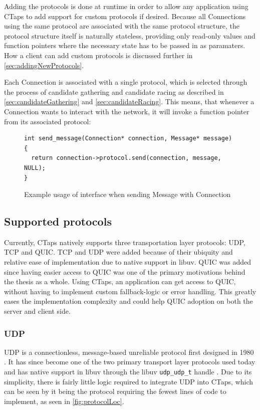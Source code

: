 Adding the protocols is done at runtime in order to allow any
application using CTaps to add support for custom protocols if
desired. Because all Connections using the same protocol are associated
with the same protocol structure, the protocol structure itself
is naturally stateless, providing only read-only values and function
pointers where the necessary state has to be passed in as paramaters.
How a client can add custom protocols is discussed further in \cref{sec:addingNewProtocols}.


Each Connection is associated with a single protocol, which
is selected through the process of candidate gathering and candidate
racing as described in \cref{sec:candidateGathering} and \cref{sec:candidateRacing}.
This means, that whenever a Connection wants to interact with the network, it
will invoke a function pointer from its associated protocol:

\begin{figure}[H]
  \begin{verbatim}
int send_message(Connection* connection, Message* message) {
  return connection->protocol.send(connection, message, NULL);
}
  \end{verbatim}
  \caption{Example usage of interface when sending Message with Connection}
\end{figure}




\subsection{Supported protocols}
Currently, CTaps natively supports three transportation layer protocols:
UDP, TCP and QUIC. TCP and UDP were added because of their ubiquity and
relative ease of implementation due to native support in libuv. QUIC was
added since having easier access to QUIC was one of the primary motivations
behind the thesis as a whole. Using CTaps, an application can get access to QUIC,
without having to implement custom fallback-logic or error handling. This
greatly eases the implementation complexity and could help QUIC adoption
on both the server and client side.

\subsubsection{UDP} \label{sec:udpImpl}
UDP is a connectionless, message-based unreliable protocol first designed
in 1980 \cite{postelUserDatagramProtocol1980}. It has since become one
of the two primary transport layer protocols used today and has native
support in libuv through the libuv \texttt{udp\_udp\_t} handle \cite{libuvLibuvUDPHandle}.
Due to its simplicity, there is fairly little logic required to integrate
UDP into CTaps, which can be seen by it being the protocol requiring the
fewest lines of code to implement, as seen in \cref{fig:protocolLoc}.

